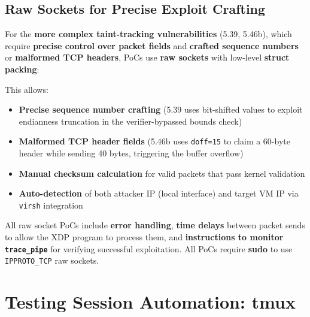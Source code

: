 \subsection{Raw Sockets for Precise Exploit Crafting}

For the \textbf{more complex taint-tracking vulnerabilities} (5.39, 5.46b), which require \textbf{precise control over packet fields} and \textbf{crafted sequence numbers} or \textbf{malformed TCP headers}, PoCs use \textbf{raw sockets} with low-level \textbf{struct packing}:

\vspace{0.3cm}
\noindent
{}
\vspace{0.3cm}

\noindent
This allows:
\begin{itemize}
  \item \textbf{Precise sequence number crafting} (5.39 uses bit-shifted values to exploit endianness truncation in the verifier-bypassed bounds check)
  \item \textbf{Malformed TCP header fields} (5.46b uses \texttt{doff=15} to claim a 60-byte header while sending 40 bytes, triggering the buffer overflow)
  \item \textbf{Manual checksum calculation} for valid packets that pass kernel validation
  \item \textbf{Auto-detection} of both attacker IP (local interface) and target VM IP via \texttt{virsh} integration
\end{itemize}

\noindent
All raw socket PoCs include \textbf{error handling}, \textbf{time delays} between packet sends to allow the XDP program to process them, and \textbf{instructions to monitor \texttt{trace\_pipe}} for verifying successful exploitation. All PoCs require \textbf{sudo} to use \texttt{IPPROTO\_TCP} raw sockets.

\section{Testing Session Automation: tmux}


